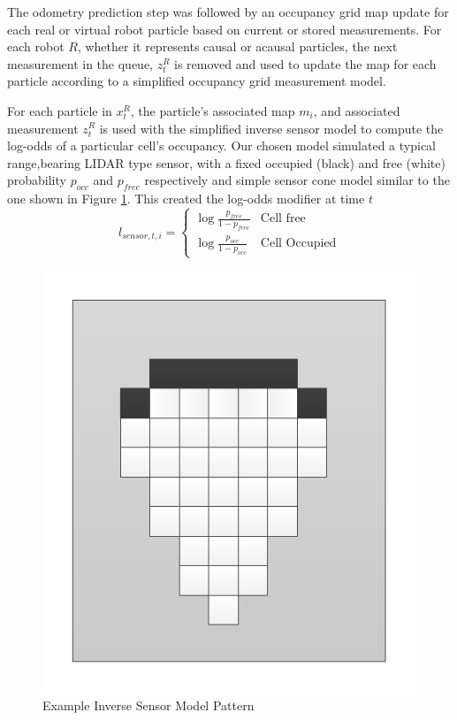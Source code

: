 The odometry prediction step was followed by an occupancy grid map update for each real or virtual robot particle based on current or stored measurements. For each robot $R$, whether it represents causal or acausal particles, the next measurement in the queue, $z_t^R$ is removed and used to update the map for each particle according to a simplified occupancy grid measurement model.

For each particle in $x_t^R$,  the particle's associated map $m_i$, and associated measurement $z_t^R$ is used with the simplified inverse sensor model to compute the log-odds of a particular cell’s occupancy. Our chosen model simulated a typical range,bearing LIDAR type sensor, with a fixed occupied (black) and free (white) probability $p_{occ}$ and $p_{free}$ respectively and simple sensor cone model similar to the one shown in Figure \ref{fig:invsensor}. This created the log-odds modifier at time $t$
$$l_{sensor,t,i}=
\begin{cases}
\log\frac{p_{free}}{1-p_{free}} & \text{Cell free}\\ 
\log\frac{p_{occ}}{1-p_{occ}} & \text{Cell Occupied}
\end{cases}$$

\begin{figure}[ht]
\centering
\includegraphics[width=\columnwidth]{../FinalFigures/invsensormodel.pdf}
\caption{Example Inverse Sensor Model Pattern}
\label{fig:invsensor}
\end{figure}

